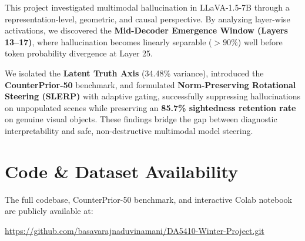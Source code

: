 \documentclass[11pt]{article}
\begin{document}
This project investigated multimodal hallucination in LLaVA-1.5-7B through a representation-level, geometric, and causal perspective. By analyzing layer-wise activations, we discovered the \textbf{Mid-Decoder Emergence Window (Layers 13--17)}, where hallucination becomes linearly separable ($>90\%$) well before token probability divergence at Layer 25.

We isolated the \textbf{Latent Truth Axis} (34.48\% variance), introduced the \textbf{CounterPrior-50} benchmark, and formulated \textbf{Norm-Preserving Rotational Steering (SLERP)} with adaptive gating, successfully suppressing hallucinations on unpopulated scenes while preserving an \textbf{85.7\% sightedness retention rate} on genuine visual objects. These findings bridge the gap between diagnostic interpretability and safe, non-destructive multimodal model steering.

\section*{Code \& Dataset Availability}
The full codebase, CounterPrior-50 benchmark, and interactive Colab notebook are publicly available at:
\begin{center}
\url{https://github.com/basavarajnaduvinamani/DA5410-Winter-Project.git}
\end{center}

\vspace{1.2em}
\end{document}
